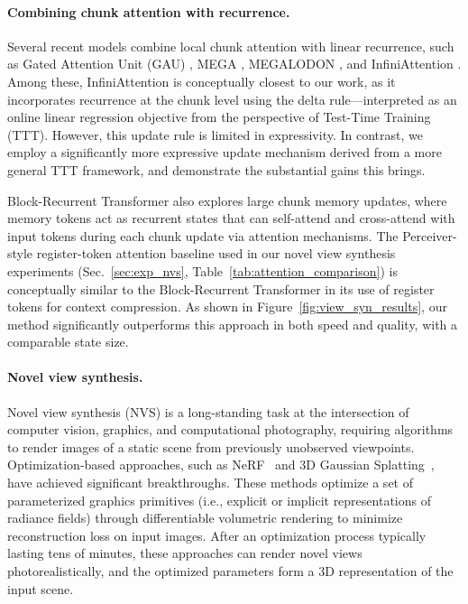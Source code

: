 \paragraph{Combining chunk attention with recurrence.}
Several recent models combine local chunk attention with linear recurrence, such as Gated Attention Unit (GAU) \cite{hua2022transformerqualitylineartime}, MEGA \cite{ma2023mega}, MEGALODON \cite{ma2024megalodon}, and InfiniAttention \cite{munkhdalai2024leavecontextbehindefficient}. Among these, InfiniAttention is conceptually closest to our work, as it incorporates recurrence at the chunk level using the delta rule—interpreted as an online linear regression objective from the perspective of Test-Time Training (TTT). However, this update rule is limited in expressivity. In contrast, we employ a significantly more expressive update mechanism derived from a more general TTT framework, and demonstrate the substantial gains this brings.

Block-Recurrent Transformer \cite{hutchins2022blockrecurrent} also explores large chunk memory updates, where memory tokens act as recurrent states that can self-attend and cross-attend with input tokens during each chunk update via attention mechanisms.  The Perceiver-style register-token attention baseline used in our novel view synthesis experiments (Sec.~\ref{sec:exp_nvs}, Table~\ref{tab:attention_comparison}) is conceptually similar to the Block-Recurrent Transformer in its use of register tokens for context compression. As shown in Figure~\ref{fig:view_syn_results}, our method significantly outperforms this approach in both speed and quality, with a comparable state size.



\paragraph{Novel view synthesis.} Novel view synthesis (NVS) is a long-standing task at the intersection of computer vision, graphics, and computational photography, requiring algorithms to render images of a static scene from previously unobserved viewpoints. Optimization-based approaches, such as NeRF~\cite{mildenhall2021nerf} and 3D Gaussian Splatting~\cite{kerbl20233d}, have achieved significant breakthroughs.
These methods optimize a set of parameterized graphics primitives (i.e., explicit or implicit representations of radiance fields) through differentiable volumetric rendering to minimize reconstruction loss on input images. After an optimization process typically lasting tens of minutes, these approaches can render novel views photorealistically, and the optimized parameters form a 3D representation of the input scene.

